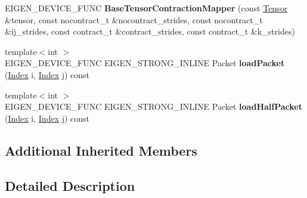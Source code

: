 \begin{DoxyCompactItemize}
\mbox{\label{class_eigen_1_1internal_1_1_base_tensor_contraction_mapper_3_01_scalar_00_01_index_00_01side_00_080d560a1738baff9d26ac7a1ec9763b_a545fb30e6d97ebe62beb82d23f67a045}} 
E\+I\+G\+E\+N\+\_\+\+D\+E\+V\+I\+C\+E\+\_\+\+F\+U\+NC {\bfseries Base\+Tensor\+Contraction\+Mapper} (const \hyperlink{class_eigen_1_1_tensor}{Tensor} \&tensor, const nocontract\+\_\+t \&nocontract\+\_\+strides, const nocontract\+\_\+t \&ij\+\_\+strides, const contract\+\_\+t \&contract\+\_\+strides, const contract\+\_\+t \&k\+\_\+strides)
\item 
\mbox{\label{class_eigen_1_1internal_1_1_base_tensor_contraction_mapper_3_01_scalar_00_01_index_00_01side_00_080d560a1738baff9d26ac7a1ec9763b_a7ef2916430d4f9383738f62f570a12d4}} 
{\footnotesize template$<$int $>$ }\\E\+I\+G\+E\+N\+\_\+\+D\+E\+V\+I\+C\+E\+\_\+\+F\+U\+NC E\+I\+G\+E\+N\+\_\+\+S\+T\+R\+O\+N\+G\+\_\+\+I\+N\+L\+I\+NE Packet {\bfseries load\+Packet} (\hyperlink{namespace_eigen_a62e77e0933482dafde8fe197d9a2cfde}{Index} i, \hyperlink{namespace_eigen_a62e77e0933482dafde8fe197d9a2cfde}{Index} j) const
\item 
\mbox{\label{class_eigen_1_1internal_1_1_base_tensor_contraction_mapper_3_01_scalar_00_01_index_00_01side_00_080d560a1738baff9d26ac7a1ec9763b_ad5541b1c9ad2606364bd6cbbe1822388}} 
{\footnotesize template$<$int $>$ }\\E\+I\+G\+E\+N\+\_\+\+D\+E\+V\+I\+C\+E\+\_\+\+F\+U\+NC E\+I\+G\+E\+N\+\_\+\+S\+T\+R\+O\+N\+G\+\_\+\+I\+N\+L\+I\+NE Packet {\bfseries load\+Half\+Packet} (\hyperlink{namespace_eigen_a62e77e0933482dafde8fe197d9a2cfde}{Index} i, \hyperlink{namespace_eigen_a62e77e0933482dafde8fe197d9a2cfde}{Index} j) const
\end{DoxyCompactItemize}
\subsection*{Additional Inherited Members}


\subsection{Detailed Description}
